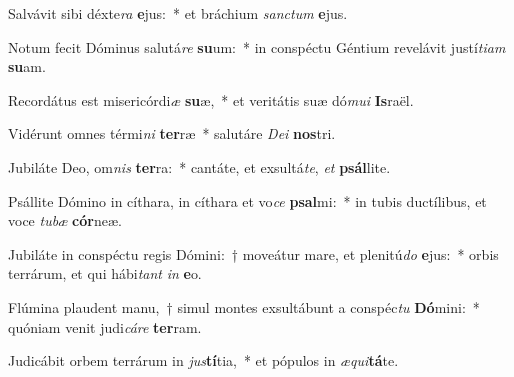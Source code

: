\item Salvávit sibi déxte\textit{ra} \textbf{e}jus:~* et bráchium \textit{sanc}\textit{tum} \textbf{e}jus.
\item Notum fecit Dóminus salutá\textit{re} \textbf{su}um:~* in conspéctu Géntium revelávit justí\textit{ti}\textit{am} \textbf{su}am.
\item Recordátus est misericórdi\textit{æ} \textbf{su}æ,~* et veritátis suæ dó\textit{mu}\textit{i} \textbf{Is}raël.
\item Vidérunt omnes térmi\textit{ni} \textbf{ter}ræ~* salutáre \textit{De}\textit{i} \textbf{nos}tri.
\item Jubiláte Deo, om\textit{nis} \textbf{ter}ra:~* cantáte, et exsultá\textit{te}, \textit{et} \textbf{psál}lite.
\item Psállite Dómino in cíthara, in cíthara et vo\textit{ce} \textbf{psal}mi:~* in tubis ductílibus, et voce \textit{tu}\textit{bæ} \textbf{cór}neæ.
\item Jubiláte in conspéctu regis Dómini:~† moveátur mare, et plenitú\textit{do} \textbf{e}jus:~* orbis terrárum, et qui hábi\textit{tant} \textit{in} \textbf{e}o.
\item Flúmina plaudent manu,~† simul montes exsultábunt a conspéc\textit{tu} \textbf{Dó}mini:~* quóniam venit judi\textit{cá}\textit{re} \textbf{ter}ram.
\item Judicábit orbem terrárum in \textit{jus}\textbf{tí}tia,~* et pópulos in \textit{æ}\textit{qui}\textbf{tá}te.
